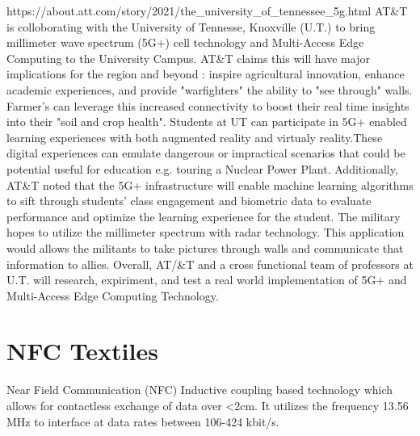 \documentclass{article}
\begin{document}
https://about.att.com/story/2021/the_university_of_tennessee_5g.html
AT\&T is colloborating with the University of Tennesse, Knoxville (U.T.) to bring millimeter wave spectrum
(5G+) cell technology and Multi-Access Edge Computing to the University Campus. AT\&T claims this will have major 
implications for the region and beyond : inspire agricultural innovation, enhance academic experiences, and provide "warfighters"
the ability to "see through" walls. Farmer's can leverage this increased connectivity to boost 
their real time insights into their "soil and crop health".
Students at UT  can participate in 5G+ enabled learning experiences with both
augmented reality and virtualy reality.These digital experiences 
can emulate dangerous or impractical scenarios that could be potential useful
for education e.g. touring a Nuclear Power Plant.  
Additionally, AT&T noted that the 5G+ infrastructure
will enable machine learning algorithms to sift through students' class engagement and biometric data to evaluate performance and optimize the learning experience for the student.
The military hopes to utilize the millimeter spectrum with radar technology. This application would allows the militants to take pictures through walls and communicate
that information to allies. Overall,
AT/&T and a cross functional team of professors at U.T.
will research, expiriment, and test a real world implementation of
5G+ and Multi-Access Edge Computing Technology.


\section*{NFC Textiles}


Near Field Communication (NFC)
Inductive coupling based technology which allows for contactless exchange of data over <2cm. 
It utilizes the frequency 13.56 MHz to interface at data rates between 106-424 kbit/s.
\end{document}
